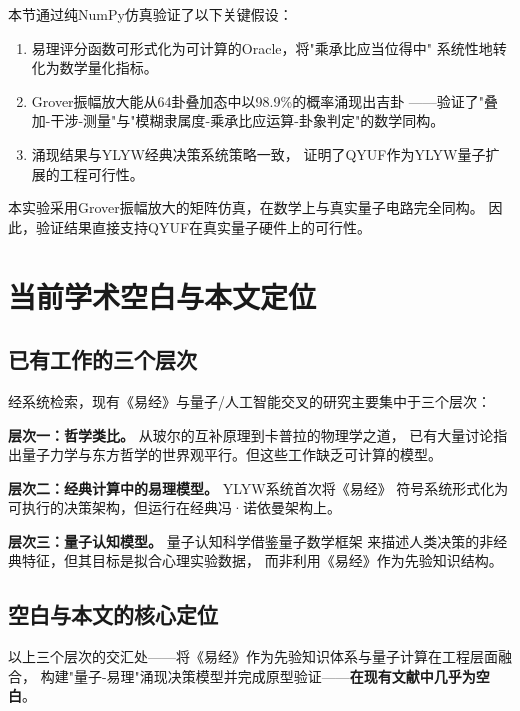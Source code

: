 \documentclass[twocolumn]{article}
\begin{document}
本节通过纯NumPy仿真验证了以下关键假设：

\begin{enumerate}
  \item 易理评分函数可形式化为可计算的Oracle，将"乘承比应当位得中"
        系统性地转化为数学量化指标。
  \item Grover振幅放大能从64卦叠加态中以98.9\%的概率涌现出吉卦
        ——验证了"叠加-干涉-测量"与"模糊隶属度-乘承比应运算-卦象判定"的数学同构。
  \item 涌现结果与YLYW经典决策系统策略一致，
        证明了QYUF作为YLYW量子扩展的工程可行性。
\end{enumerate}

本实验采用Grover振幅放大的矩阵仿真，在数学上与真实量子电路完全同构。
因此，验证结果直接支持QYUF在真实量子硬件上的可行性。

\section{当前学术空白与本文定位}

\subsection{已有工作的三个层次}

经系统检索，现有《易经》与量子/人工智能交叉的研究主要集中于三个层次：

\textbf{层次一：哲学类比。} 从玻尔的互补原理到卡普拉的物理学之道\cite{capra1975}，
已有大量讨论指出量子力学与东方哲学的世界观平行。但这些工作缺乏可计算的模型。

\textbf{层次二：经典计算中的易理模型。} YLYW系统\cite{ylyw2026}首次将《易经》
符号系统形式化为可执行的决策架构，但运行在经典冯·诺依曼架构上。

\textbf{层次三：量子认知模型。} 量子认知科学\cite{busemeyer2015}借鉴量子数学框架
来描述人类决策的非经典特征，但其目标是拟合心理实验数据，
而非利用《易经》作为先验知识结构。

\subsection{空白与本文的核心定位}

以上三个层次的交汇处——将《易经》作为先验知识体系与量子计算在工程层面融合，
构建"量子-易理"涌现决策模型并完成原型验证——\textbf{在现有文献中几乎为空白}。
\end{document}
